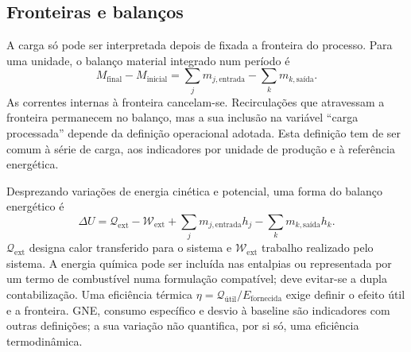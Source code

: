 \subsection{Fronteiras e balanços}
\label{sec:mat-balancos}
A carga só pode ser interpretada depois de fixada a fronteira do processo. Para uma unidade, o balanço material integrado num período é
\begin{equation}
M_{\mathrm{final}}-M_{\mathrm{inicial}}
=\sum_j m_{j,\mathrm{entrada}}-\sum_k m_{k,\mathrm{saída}}.
\label{eq:mat-balanco-material}
\end{equation}
As correntes internas à fronteira cancelam-se. Recirculações que atravessam a fronteira permanecem no balanço, mas a sua inclusão na variável ``carga processada'' depende da definição operacional adotada. Esta definição tem de ser comum à série de carga, aos indicadores por unidade de produção e à referência energética.

Desprezando variações de energia cinética e potencial, uma forma do balanço energético é
\begin{equation}
\Delta U=\mathcal Q_{\mathrm{ext}}-\mathcal W_{\mathrm{ext}}
+\sum_j m_{j,\mathrm{entrada}}h_j-\sum_k m_{k,\mathrm{saída}}h_k.
\label{eq:mat-balanco-energia}
\end{equation}
$\mathcal Q_{\mathrm{ext}}$ designa calor transferido para o sistema e $\mathcal W_{\mathrm{ext}}$ trabalho realizado pelo sistema. A energia química pode ser incluída nas entalpias ou representada por um termo de combustível numa formulação compatível; deve evitar-se a dupla contabilização. Uma eficiência térmica $\eta=\mathcal Q_{\mathrm{útil}}/E_{\mathrm{fornecida}}$ exige definir o efeito útil e a fronteira. GNE, consumo específico e desvio à baseline são indicadores com outras definições; a sua variação não quantifica, por si só, uma eficiência termodinâmica.


